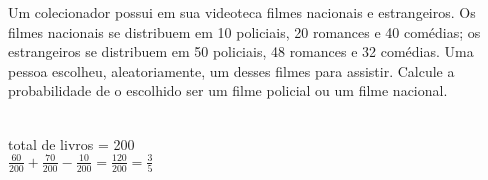 \begin{ex}
Um colecionador possui em sua videoteca filmes nacionais e estrangeiros. Os filmes nacionais se distribuem em 10 policiais, 20 romances e 40 comédias; os estrangeiros se distribuem em 50 policiais, 48 romances e 32 comédias. Uma pessoa escolheu, aleatoriamente, um desses filmes para assistir. Calcule a probabilidade de o escolhido ser um filme policial ou um filme nacional.
  \begin{sol}
   \phantom{A} \\
   total de livros = 200 \\
   $\frac{60}{200}+\frac{70}{200}-\frac{10}{200}=\frac{120}{200}=\frac{3}{5}$
  \end{sol}
\end{ex}